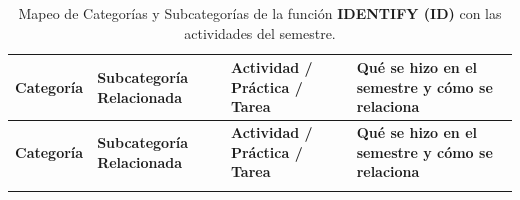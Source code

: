 \documentclass[letterpaper,11pt]{article}
\begin{document}
\begingroup
\scriptsize
\setlength{\tabcolsep}{4pt}
\renewcommand{\arraystretch}{1.24}
\begin{longtable}{|L{2.8cm}|L{4.5cm}|L{2.9cm}|L{6.5cm}|}
\caption{Mapeo de Categorías y Subcategorías de la función \textbf{IDENTIFY (ID)} con las actividades del semestre.}
\label{tab:mapeo-id} \\
\hline
{}
\textbf{Categoría} & \textbf{Subcategoría Relacionada} & \textbf{Actividad / Práctica / Tarea} & \textbf{Qué se hizo en el semestre y cómo se relaciona} \\
\hline
\endfirsthead
\hline
{}
\textbf{Categoría} & \textbf{Subcategoría Relacionada} & \textbf{Actividad / Práctica / Tarea} & \textbf{Qué se hizo en el semestre y cómo se relaciona} \\
\hline
\endhead
\hline
\endfoot


\end{longtable}
\end{document}
